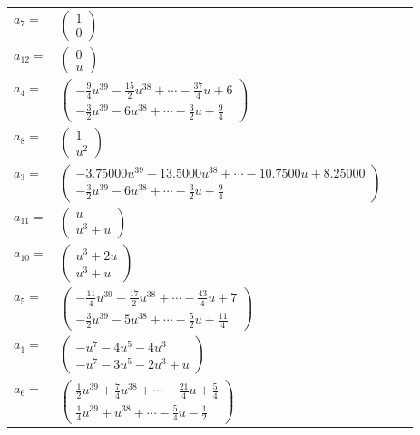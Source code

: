 \documentclass[1p]{elsarticle_modified}
\theoremstyle{definition}
\begin{document}
\begin{tabular}{m{7pt} m{180pt} m{7pt} m{180pt} }
\flushright $a_{7}=$&$\begin{pmatrix}1\\0\end{pmatrix}$ \\
\flushright $a_{12}=$&$\begin{pmatrix}0\\u\end{pmatrix}$ \\
\flushright $a_{4}=$&$\begin{pmatrix}-\frac{9}{4} u^{39}-\frac{15}{2} u^{38}+\cdots-\frac{37}{4} u+6\\-\frac{3}{2} u^{39}-6 u^{38}+\cdots-\frac{3}{2} u+\frac{9}{4}\end{pmatrix}$ \\
\flushright $a_{8}=$&$\begin{pmatrix}1\\u^2\end{pmatrix}$ \\
\flushright $a_{3}=$&$\begin{pmatrix}-3.75000 u^{39}-13.5000 u^{38}+\cdots-10.7500 u+8.25000\\-\frac{3}{2} u^{39}-6 u^{38}+\cdots-\frac{3}{2} u+\frac{9}{4}\end{pmatrix}$ \\
\flushright $a_{11}=$&$\begin{pmatrix}u\\u^3+u\end{pmatrix}$ \\
\flushright $a_{10}=$&$\begin{pmatrix}u^3+2 u\\u^3+u\end{pmatrix}$ \\
\flushright $a_{5}=$&$\begin{pmatrix}-\frac{11}{4} u^{39}-\frac{17}{2} u^{38}+\cdots-\frac{43}{4} u+7\\-\frac{3}{2} u^{39}-5 u^{38}+\cdots-\frac{5}{2} u+\frac{11}{4}\end{pmatrix}$ \\
\flushright $a_{1}=$&$\begin{pmatrix}- u^7-4 u^5-4 u^3\\- u^7-3 u^5-2 u^3+u\end{pmatrix}$ \\
\flushright $a_{6}=$&$\begin{pmatrix}\frac{1}{2} u^{39}+\frac{7}{4} u^{38}+\cdots-\frac{21}{4} u+\frac{5}{4}\\\frac{1}{4} u^{39}+u^{38}+\cdots-\frac{5}{4} u-\frac{1}{2}\end{pmatrix}$ \\

\end{tabular}
\end{document}
